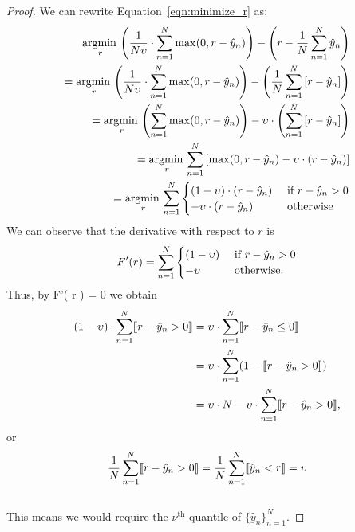 \begin{proof}
 We can rewrite Equation~\ref{eqn:minimize_r} as:
\begin{align*}
\underset{r}{\operatorname{argmin}\,} \left( \frac{1}{N\upsilon} \cdot \sum_{n = 1}^N \max( 0, r - \hat{y}_n ) \right) - \left( r - \frac{1}{N} \sum_{n = 1}^{N} \hat{y}_n \right) \\
= \underset{r}{\operatorname{argmin}\,} \left( \frac{1}{N\upsilon} \cdot \sum_{n = 1}^N \max( 0, r - \hat{y}_n ) \right) - \left( \frac{1}{N} \sum_{n = 1}^{N} \left[ r - \hat{y}_n \right] \right) \\
= \underset{r}{\operatorname{argmin}\,} \left( \sum_{n = 1}^N \max( 0, r - \hat{y}_n ) \right) - \upsilon \cdot \left( \sum_{n = 1}^{N} \left[ r - \hat{y}_n \right] \right) \\
= \underset{r}{\operatorname{argmin}\,} \sum_{n = 1}^N \left[ \max( 0, r - \hat{y}_n ) - \upsilon \cdot \left( r - \hat{y}_n \right) \right] \\
= \underset{r}{\operatorname{argmin}\,} \sum_{n = 1}^N
\begin{cases} (1 - \upsilon) \cdot \left( r - \hat{y}_n \right) & \text{ if } r - \hat{y}_n > 0 \\ - \upsilon \cdot \left( r - \hat{y}_n \right) & \text{ otherwise}
\end{cases}
\end{align*}
\vspace{-0.1cm}
We can observe that the derivative with respect to $r$ is
$$ F'( r ) = \sum_{n = 1}^N \begin{cases} (1 - \upsilon) & \text{ if } r - \hat{y}_n > 0 \\ -\upsilon & \text{ otherwise. } \end{cases} $$
Thus, by F'( r ) = 0 we obtain
%
\begin{align*}
	(1 - \upsilon) \cdot \sum_{n = 1}^N \llbracket  r - \hat{y}_n > 0  \rrbracket &= \upsilon \cdot \sum_{n = 1}^N \llbracket  r - \hat{y}_n \leq 0  \rrbracket \\
	&= \upsilon \cdot \sum_{n = 1}^N (1 - \llbracket  r - \hat{y}_n > 0  \rrbracket) \\
	&= \upsilon \cdot N - \upsilon \cdot \sum_{n = 1}^N \llbracket  r - \hat{y}_n > 0  \rrbracket,
\end{align*}
or
\begin{equation}
 \frac{1}{N} \sum_{n = 1}^N \llbracket  r -\hat{y}_n > 0  \rrbracket= \frac{1}{N} \sum_{n = 1}^N \llbracket  \hat{y}_n < r  \rrbracket = \upsilon
\end{equation}\\
This means we would require the $\nu^{\text{th}}$ quantile of $\{ \hat{y}_n \}_{n = 1}^N$.
\end{proof}
\vspace{-0.3cm}
